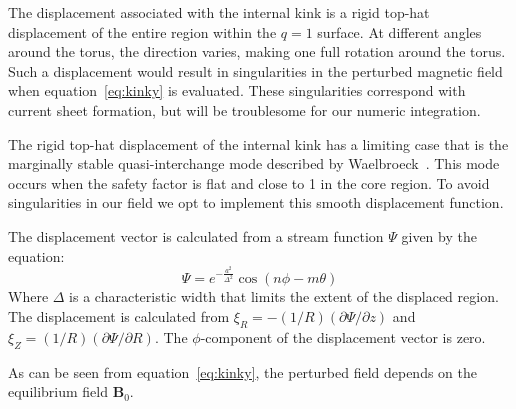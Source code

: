 \documentclass[%
superscriptaddress,
amsmath,amssymb,
aps,
pre,
floatfix,
]{revtex4-2}
\begin{document}
The displacement associated with the internal kink is a rigid top-hat displacement of the entire region within the $q=1$ surface. 
At different angles around the torus, the direction varies, making one full rotation around the torus. 
Such a displacement would result in singularities in the perturbed magnetic field when equation~\eqref{eq:kinky} is evaluated. 
These singularities correspond with current sheet formation, but will be troublesome for our numeric integration.

The rigid top-hat displacement of the internal kink has a limiting case that is the marginally stable quasi-interchange mode described by Waelbroeck~\cite{waelbroeck1989nonlinear}. 
This mode occurs when the safety factor is flat and close to 1 in the core region. 
To avoid singularities in our field we opt to implement this smooth displacement function. 

The displacement vector is calculated from a stream function $\Psi$ given by the equation: 
\begin{equation}
    \Psi = e^{-\frac{a^2}{\Delta^2}}\cos(n \phi - m \theta)
\end{equation}
Where $\Delta$ is a characteristic width that limits the extent of the displaced region. 
The displacement is calculated from $\xi_R= -(1/R) (\partial \Psi/\partial z)$ and $\xi_Z= (1/R) (\partial \Psi/\partial R)$. 
The $\phi$-component of the displacement vector is zero. 

As can be seen from equation~\eqref{eq:kinky}, the perturbed field depends on the equilibrium field $\mathbf{B}_0$. 
\end{document}
